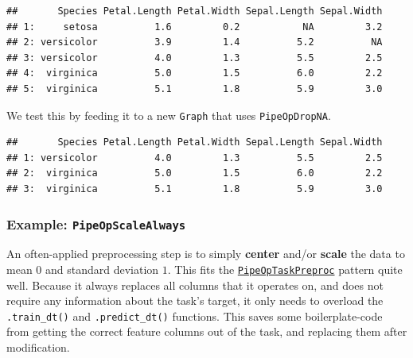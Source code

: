 \documentclass[
]{scrbook}
\newenvironment{Shaded}{\begin{snugshade}}{\end{snugshade}}
\newcommand{\DecValTok}[1]{\textcolor[rgb]{0.00,0.00,0.81}{#1}}
\newcommand{\FunctionTok}[1]{\textcolor[rgb]{0.00,0.00,0.00}{#1}}
\newcommand{\NormalTok}[1]{#1}
\newcommand{\OtherTok}[1]{\textcolor[rgb]{0.56,0.35,0.01}{#1}}
\newcommand{\SpecialCharTok}[1]{\textcolor[rgb]{0.00,0.00,0.00}{#1}}
\renewenvironment{Shaded} {\begin{snugshade}\small} {\end{snugshade}}
\begin{document}
\begin{verbatim}
##       Species Petal.Length Petal.Width Sepal.Length Sepal.Width
## 1:     setosa          1.6         0.2           NA         3.2
## 2: versicolor          3.9         1.4          5.2          NA
## 3: versicolor          4.0         1.3          5.5         2.5
## 4:  virginica          5.0         1.5          6.0         2.2
## 5:  virginica          5.1         1.8          5.9         3.0
\end{verbatim}

We test this by feeding it to a new \texttt{Graph} that uses \texttt{PipeOpDropNA}.

\begin{Shaded}
\end{Shaded}

\begin{verbatim}
##       Species Petal.Length Petal.Width Sepal.Length Sepal.Width
## 1: versicolor          4.0         1.3          5.5         2.5
## 2:  virginica          5.0         1.5          6.0         2.2
## 3:  virginica          5.1         1.8          5.9         3.0
\end{verbatim}

\hypertarget{example-pipeopscalealways}{%
\subsubsection{\texorpdfstring{Example: \texttt{PipeOpScaleAlways}}{Example: PipeOpScaleAlways}}\label{example-pipeopscalealways}}

An often-applied preprocessing step is to simply \textbf{center} and/or \textbf{scale} the data to mean \(0\) and standard deviation \(1\).
This fits the \href{https://mlr3pipelines.mlr-org.com/reference/PipeOpTaskPreproc.html}{\texttt{PipeOpTaskPreproc}} pattern quite well.
Because it always replaces all columns that it operates on, and does not require any information about the task's target, it only needs to overload the \texttt{.train\_dt()} and \texttt{.predict\_dt()} functions.
This saves some boilerplate-code from getting the correct feature columns out of the task, and replacing them after modification.
\end{document}
